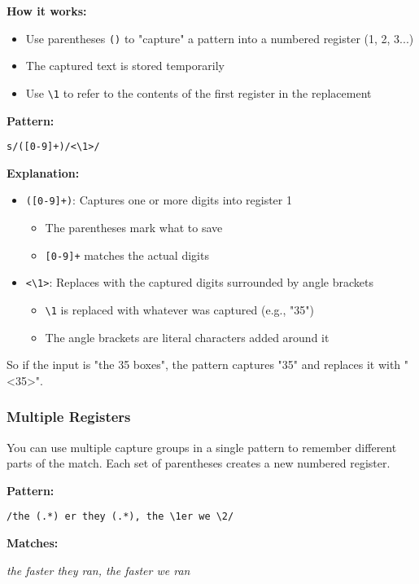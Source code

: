 \documentclass[11pt,a4paper]{article}
\theoremstyle{definition}
\theoremstyle{plain}
\theoremstyle{remark}
\begin{document}
\textbf{How it works:}
\begin{itemize}
    \item Use parentheses \texttt{()} to "capture" a pattern into a numbered register (1, 2, 3...)
    \item The captured text is stored temporarily
    \item Use \verb|\1| to refer to the contents of the first register in the replacement
\end{itemize}

\textbf{Pattern:}

\texttt{s/([0-9]+)/<\textbackslash 1>/}

\textbf{Explanation:}
\begin{itemize}
    \item \texttt{([0-9]+)}: Captures one or more digits into register 1
    \begin{itemize}
        \item The parentheses mark what to save
        \item \texttt{[0-9]+} matches the actual digits
    \end{itemize}
    \item \texttt{<\textbackslash 1>}: Replaces with the captured digits surrounded by angle brackets
    \begin{itemize}
        \item \verb|\1| is replaced with whatever was captured (e.g., "35")
        \item The angle brackets are literal characters added around it
    \end{itemize}
\end{itemize}

So if the input is "the 35 boxes", the pattern captures "35" and replaces it with "<35>".

\subsubsection{Multiple Registers}

You can use multiple capture groups in a single pattern to remember different parts of the match. Each set of parentheses creates a new numbered register.

\textbf{Pattern:}

\texttt{/the (.*) er they (.*), the \textbackslash 1er we \textbackslash 2/}

\textbf{Matches:}

\textit{the faster they ran, the faster we ran}
\end{document}
